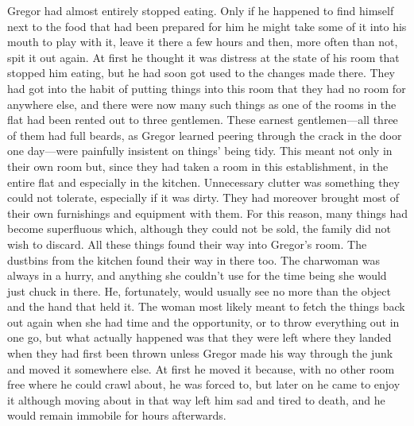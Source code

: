 Gregor had almost entirely stopped eating. Only if he happened to find
himself next to the food that had been prepared for him he might take
some of it into his mouth to play with it, leave it there a few hours
and then, more often than not, spit it out again. At first he thought
it was distress at the state of his room that stopped him eating, but
he had soon got used to the changes made there. They had got into the
habit of putting things into this room that they had no room for
anywhere else, and there were now many such things as one of the rooms
in the flat had been rented out to three gentlemen. These earnest
gentlemen—all three of them had full beards, as Gregor learned peering
through the crack in the door one day—were painfully insistent on
things’ being tidy. This meant not only in their own room but, since
they had taken a room in this establishment, in the entire flat and
especially in the kitchen. Unnecessary clutter was something they could
not tolerate, especially if it was dirty. They had moreover brought
most of their own furnishings and equipment with them. For this reason,
many things had become superfluous which, although they could not be
sold, the family did not wish to discard. All these things found their
way into Gregor’s room. The dustbins from the kitchen found their way
in there too. The charwoman was always in a hurry, and anything she
couldn’t use for the time being she would just chuck in there. He,
fortunately, would usually see no more than the object and the hand
that held it. The woman most likely meant to fetch the things back out
again when she had time and the opportunity, or to throw everything out
in one go, but what actually happened was that they were left where
they landed when they had first been thrown unless Gregor made his way
through the junk and moved it somewhere else. At first he moved it
because, with no other room free where he could crawl about, he was
forced to, but later on he came to enjoy it although moving about in
that way left him sad and tired to death, and he would remain immobile
for hours afterwards.

